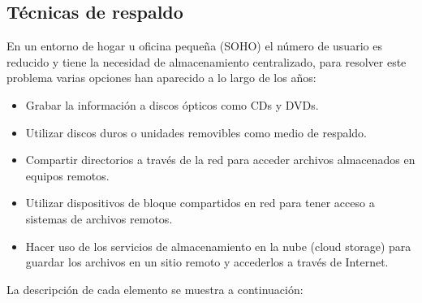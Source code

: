   \subsection {T\'{e}cnicas de respaldo}
  

En un entorno de hogar u oficina peque\~{n}a (SOHO) el n\'{u}mero de usuario es reducido y tiene la necesidad de almacenamiento centralizado, para resolver este problema varias opciones han aparecido a lo largo de los a\~{n}os:

    \begin{itemize}
      \item Grabar la informaci\'{o}n a discos \'{o}pticos como CDs y DVDs.
      \item Utilizar discos duros o unidades removibles como medio de respaldo.
      \item Compartir directorios a trav\'{e}s de la red para acceder archivos almacenados en equipos remotos.
      \item Utilizar dispositivos de bloque compartidos en red para tener acceso a sistemas de archivos remotos.
      \item Hacer uso de los servicios de almacenamiento en la nube (cloud storage) para guardar los archivos en un sitio remoto y accederlos a trav\'{e}s de Internet.
    \end{itemize}

La descripci\'{o}n de cada elemento se muestra a continuaci\'{o}n:

